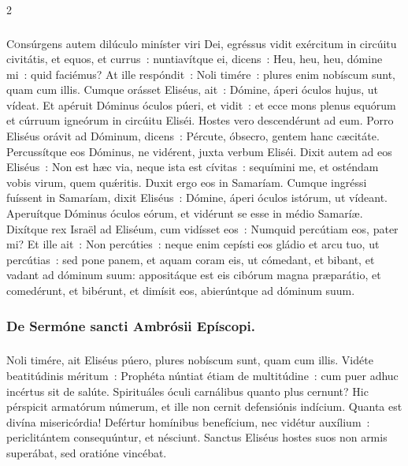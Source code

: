 \documentclass[9pt,twoside]{extarticle}
\begin{document}
\begin{multicols}{2}
\subsubsection*{\center {}}
\lettrine{C}onsúrgens autem dilúculo miníster viri Dei, egréssus vidit exércitum in circúitu civitátis, et equos, et currus~: nuntiavítque ei, dicens~: Heu, heu, heu, dómine mi~: quid faciémus?
At ille respóndit~: Noli timére~: plures enim nobíscum sunt, quam cum illis.
Cumque orásset Eliséus, ait~: Dómine, áperi óculos hujus, ut vídeat. Et apéruit Dóminus óculos púeri, et vidit~: et ecce mons plenus equórum et cúrruum igneórum in circúitu Eliséi.
Hostes vero descendérunt ad eum. Porro Eliséus orávit ad Dóminum, dicens~: Pércute, óbsecro, gentem hanc cæcitáte. Percussítque eos Dóminus, ne vidérent, juxta verbum Eliséi.
Dixit autem ad eos Eliséus~: Non est hæc via, neque ista est cívitas~: sequímini me, et osténdam vobis virum, quem quǽritis. Duxit ergo eos in Samaríam.
Cumque ingréssi fuíssent in Samaríam, dixit Eliséus~: Dómine, áperi óculos istórum, ut vídeant. Aperuítque Dóminus óculos eórum, et vidérunt se esse in médio Samaríæ.
Dixítque rex Israël ad Eliséum, cum vidísset eos~: Numquid percútiam eos, pater mi?
Et ille ait~: Non percúties~: neque enim cepísti eos gládio et arcu tuo, ut percútias~: sed pone panem, et aquam coram eis, ut cómedant, et bibant, et vadant ad dóminum suum:
appositáque est eis cibórum magna præparátio, et comedérunt, et bibérunt, et dimísit eos, abierúntque ad dóminum suum.

\subsubsection*{\center De Sermóne sancti Ambrósii Epíscopi.}
\subsubsection*{\center {}}
\lettrine{N}oli timére, ait Eliséus púero, plures nobíscum sunt, quam cum illis. Vidéte beatitúdinis méritum~: Prophéta núntiat étiam de multitúdine~: cum puer adhuc incértus sit de salúte. Spirituáles óculi carnálibus quanto plus cernunt? Hic pérspicit armatórum númerum, et ille non cernit defensiónis indícium. Quanta est divína misericórdia! Defértur homínibus benefícium, nec vidétur auxílium~: periclitántem consequúntur, et nésciunt. Sanctus Eliséus hostes suos non armis superábat, sed oratióne vincébat.


\end{multicols}
\end{document}
